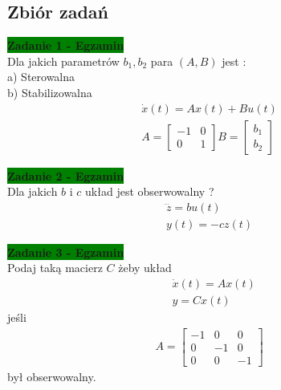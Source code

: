 \documentclass[a4paper,11pt]{article}
\begin{document}
\subsection{Zbiór zadań}
\begin{framed}
\textbf{\colorbox{green}{Zadanie 1 - Egzamin }} \\ 
Dla jakich parametrów \( b_{1}, b_{2} \) para \( (A,B) \) jest : \\
a) Sterowalna \\
b) Stabilizowalna
\begin{align*}
\dot{x}(t)=Ax(t)+Bu(t) \\
A =
\begin{bmatrix}
-1 & 0 \\
0 & 1 
\end{bmatrix}
B = 
\begin{bmatrix}
b_{1} \\
b_{2}
\end{bmatrix}
\end{align*}
\end{framed}

\begin{framed}
\textbf{\colorbox{green}{Zadanie 2 - Egzamin }} \\ 
Dla jakich \( b\) i \(c\) układ jest obserwowalny ?
\begin{align*}
\dddot{z}=bu(t) \\
y(t)=-cz(t)
\end{align*}
\end{framed}

\begin{framed}
\textbf{\colorbox{green}{Zadanie 3 - Egzamin} } \\ 
Podaj taką macierz \( C \) żeby układ 
\begin{align*}
&\dot{x}(t)=Ax(t) \\
&y=Cx(t)
\end{align*}
jeśli
\begin{align*}
A = 
\begin{bmatrix}
-1 & 0 & 0 \\
0 & -1 & 0 \\
0 & 0 & -1 
\end{bmatrix}
\end{align*}
był obserwowalny.
\end{framed}

\newpage
\end{document}
